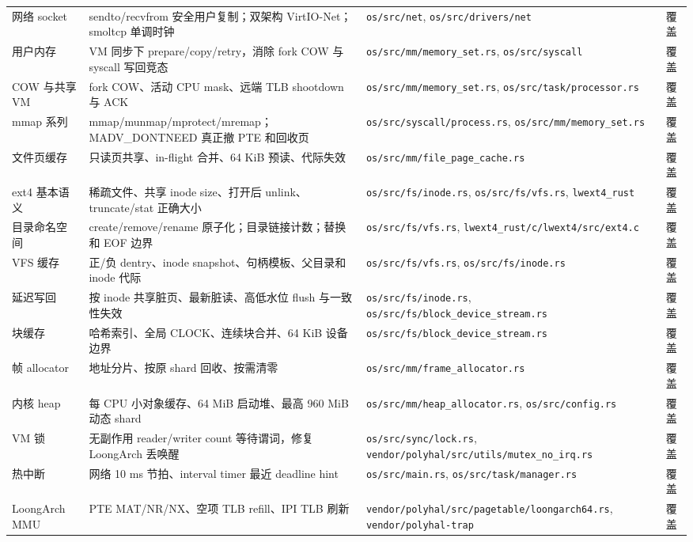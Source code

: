 \documentclass[UTF8,zihao=-4]{ctexart}
\newcommand{\code}{\nolinkurl}
\begin{document}
\begin{longtable}{p{}p{}p{}p{}}
网络 socket & sendto/recvfrom 安全用户复制；双架构 VirtIO-Net；smoltcp 单调时钟 & \code{os/src/net}, \code{os/src/drivers/net} & 覆盖 \\
用户内存 & VM 同步下 prepare/copy/retry，消除 fork COW 与 syscall 写回竞态 & \code{os/src/mm/memory_set.rs}, \code{os/src/syscall} & 覆盖 \\
COW 与共享 VM & fork COW、活动 CPU mask、远端 TLB shootdown 与 ACK & \code{os/src/mm/memory_set.rs}, \code{os/src/task/processor.rs} & 覆盖 \\
mmap 系列 & mmap/munmap/mprotect/mremap；MADV\_DONTNEED 真正撤 PTE 和回收页 & \code{os/src/syscall/process.rs}, \code{os/src/mm/memory_set.rs} & 覆盖 \\
文件页缓存 & 只读页共享、in-flight 合并、64 KiB 预读、代际失效 & \code{os/src/mm/file_page_cache.rs} & 覆盖 \\
ext4 基本语义 & 稀疏文件、共享 inode size、打开后 unlink、truncate/stat 正确大小 & \code{os/src/fs/inode.rs}, \code{os/src/fs/vfs.rs}, \code{lwext4_rust} & 覆盖 \\
目录命名空间 & create/remove/rename 原子化；目录链接计数；替换和 EOF 边界 & \code{os/src/fs/vfs.rs}, \code{lwext4_rust/c/lwext4/src/ext4.c} & 覆盖 \\
VFS 缓存 & 正/负 dentry、inode snapshot、句柄模板、父目录和 inode 代际 & \code{os/src/fs/vfs.rs}, \code{os/src/fs/inode.rs} & 覆盖 \\
延迟写回 & 按 inode 共享脏页、最新脏读、高低水位 flush 与一致性失效 & \code{os/src/fs/inode.rs}, \code{os/src/fs/block_device_stream.rs} & 覆盖 \\
块缓存 & 哈希索引、全局 CLOCK、连续块合并、64 KiB 设备边界 & \code{os/src/fs/block_device_stream.rs} & 覆盖 \\
帧 allocator & 地址分片、按原 shard 回收、按需清零 & \code{os/src/mm/frame_allocator.rs} & 覆盖 \\
内核 heap & 每 CPU 小对象缓存、64 MiB 启动堆、最高 960 MiB 动态 shard & \code{os/src/mm/heap_allocator.rs}, \code{os/src/config.rs} & 覆盖 \\
VM 锁 & 无副作用 reader/writer count 等待谓词，修复 LoongArch 丢唤醒 & \code{os/src/sync/lock.rs}, \code{vendor/polyhal/src/utils/mutex_no_irq.rs} & 覆盖 \\
热中断 & 网络 10 ms 节拍、interval timer 最近 deadline hint & \code{os/src/main.rs}, \code{os/src/task/manager.rs} & 覆盖 \\
LoongArch MMU & PTE MAT/NR/NX、空项 TLB refill、IPI TLB 刷新 & \code{vendor/polyhal/src/pagetable/loongarch64.rs}, \code{vendor/polyhal-trap} & 覆盖 \\

\end{longtable}
\end{document}

